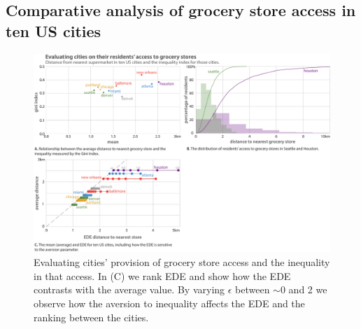 \documentclass[final,3p,times,onecolumn,sort&compress]{elsarticle}
\begin{document}
\subsection{Comparative analysis of grocery store access in ten US cities}
\begin{figure}

    \includegraphics[width=\linewidth]{report/fig/fig2.pdf}
    \caption{
    Evaluating cities’ provision of grocery store access and the inequality in that access. In (C) we rank EDE and show how the EDE contrasts with the average value. By varying $\epsilon$ between $\sim$0 and 2 we observe how the aversion to inequality affects the EDE and the ranking between the cities.
    \label{fig:comparative}
    }
    
\end{figure}
\end{document}
